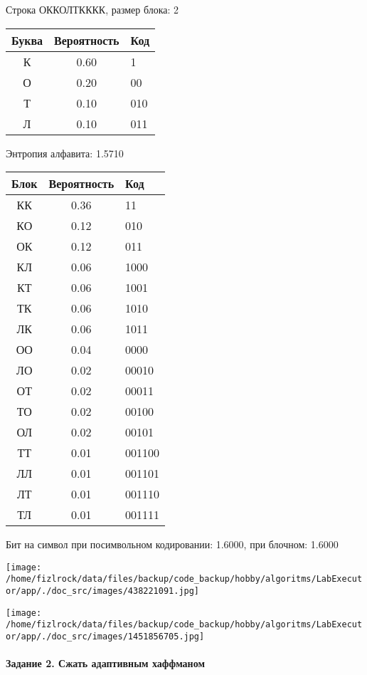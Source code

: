 \documentclass[a4paper, 12pt]{article}
\begin{document}
Строка ОККОЛТКККК, размер блока: 2
\begin{center}
 \begin{tabular}{ |c|c|l| } 
  \hline
     Буква & Вероятность & Код\\ \hline
К & 0.60 & 1\\\hline
О & 0.20 & 00\\\hline
Т & 0.10 & 010\\\hline
Л & 0.10 & 011
\\ \hline \end{tabular}
\end{center}
Энтропия алфавита: 1.5710
\begin{center}
 \begin{tabular}{ |c|c|l| } 
  \hline
     Блок & Вероятность & Код\\ \hline
КК & 0.36 & 11\\\hline
КО & 0.12 & 010\\\hline
ОК & 0.12 & 011\\\hline
КЛ & 0.06 & 1000\\\hline
КТ & 0.06 & 1001\\\hline
ТК & 0.06 & 1010\\\hline
ЛК & 0.06 & 1011\\\hline
ОО & 0.04 & 0000\\\hline
ЛО & 0.02 & 00010\\\hline
ОТ & 0.02 & 00011\\\hline
ТО & 0.02 & 00100\\\hline
ОЛ & 0.02 & 00101\\\hline
ТТ & 0.01 & 001100\\\hline
ЛЛ & 0.01 & 001101\\\hline
ЛТ & 0.01 & 001110\\\hline
ТЛ & 0.01 & 001111
\\ \hline \end{tabular}
\end{center}
Бит на символ при посимвольном кодировании: 1.6000, при блочном: 1.6000

\texttt{[image: /home/fizlrock/data/files/backup/code\_backup/hobby/algoritms/LabExecutor/app/./doc\_src/images/438221091.jpg]}

\texttt{[image: /home/fizlrock/data/files/backup/code\_backup/hobby/algoritms/LabExecutor/app/./doc\_src/images/1451856705.jpg]}
\pagebreak
\paragraph{Задание 2. Сжать адаптивным хаффманом\\}
\end{document}
